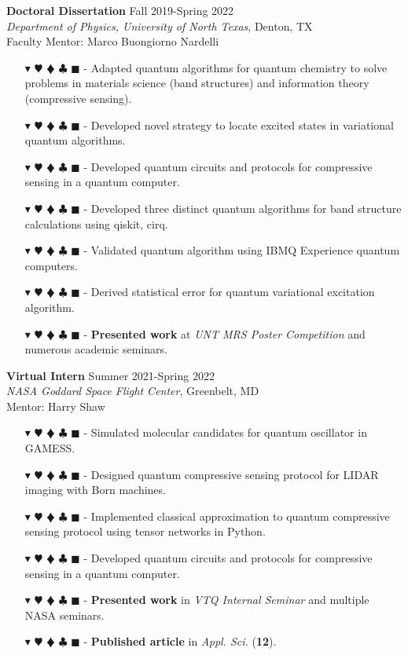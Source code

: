 \documentclass[overlapped, 10pt]{res} %
\newcommand{\physics}{$\blacktriangledown$}
\newcommand{\biochem}{$\varheartsuit$}
\newcommand{\shannon}{$\vardiamondsuit$}
\newcommand{\classic}{$\clubsuit$}
\newcommand{\quantum}{$\blacksquare$}
\newcommand{\physicscolor}{\color{YellowOrange}}
\newcommand{\biochemcolor}{\color{Emerald}}
\newcommand{\shannoncolor}{\color{Goldenrod}}
\newcommand{\classiccolor}{\color{Cyan}}
\newcommand{\quantumcolor}{\color{RedOrange}}
\newcommand{\tag}[1]{
    {\IfSubStr{#1}{\physics}{\physicscolor}{\color{White}}\physics}
    {\IfSubStr{#1}{\biochem}{\biochemcolor}{\color{White}}\biochem}
    {\IfSubStr{#1}{\shannon}{\shannoncolor}{\color{White}}\shannon}
    {\IfSubStr{#1}{\classic}{\classiccolor}{\color{White}}\classic}
    {\IfSubStr{#1}{\quantum}{\quantumcolor}{\color{White}}\quantum}
}
\begin{document}
\begin{resume}
\textbf{Doctoral Dissertation} \hfill Fall 2019-Spring 2022 \\
\textit{Department of Physics, University of North Texas}, Denton, TX \\
Faculty Mentor: Marco Buongiorno Nardelli
\begin{itemize} \itemsep -2pt %
\item[\tag{\physics\biochem\shannon\quantum}-] Adapted quantum algorithms for quantum chemistry to solve problems in materials science (band structures) and information theory (compressive sensing).
\item[\tag{\physics\quantum}-] Developed novel strategy to locate excited states in variational quantum algorithms.
\item[\tag{\shannon\quantum}-] Developed quantum circuits and protocols for compressive sensing in a quantum computer.
\item[\tag{\physics\quantum}-] Developed three distinct quantum algorithms for band structure calculations using qiskit, cirq.
\item[\tag{\physics\quantum}-] Validated quantum algorithm using IBMQ Experience quantum computers.
\item[\tag{\physics\quantum}-] Derived statistical error for quantum variational excitation algorithm.
\item[\tag{}-] \textbf{Presented work} at \textit{UNT MRS Poster Competition} and numerous academic seminars.
\end{itemize}

\textbf{Virtual Intern} \hfill Summer 2021-Spring 2022 \\
\textit{NASA Goddard Space Flight Center}, Greenbelt, MD \\
Mentor: Harry Shaw
\begin{itemize} \itemsep -2pt %
\item[\tag{\biochem\classic}-] Simulated molecular candidates for quantum oscillator in GAMESS.
\item[\tag{\shannon\quantum}-] Designed quantum compressive sensing protocol for LIDAR imaging with Born machines.
\item[\tag{\shannon\classic\quantum}-] Implemented classical approximation to quantum compressive sensing protocol using tensor networks in Python.
\item[\tag{\shannon\quantum}-] Developed quantum circuits and protocols for compressive sensing in a quantum computer.
\item[\tag{}-] \textbf{Presented work} in \textit{VTQ Internal Seminar} and multiple NASA seminars.
\item[\tag{}-] \textbf{Published article} in \textit{Appl. Sci.} (\textbf{12}).
\end{itemize}


\end{resume}
\end{document}
